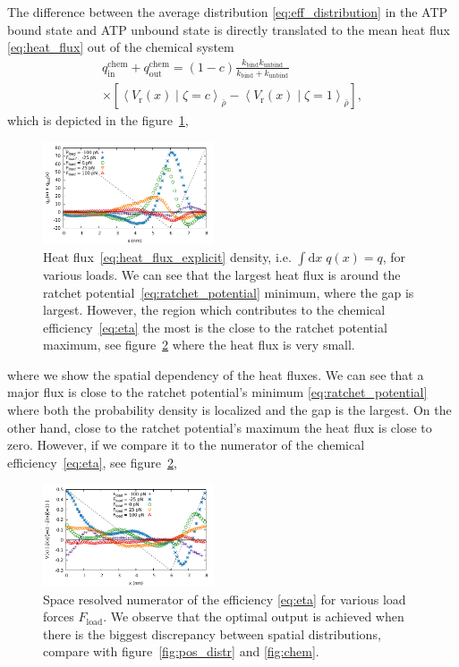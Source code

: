 \documentclass[aps,pre,twocolumn,showpacs,showkeys,superscriptaddress,floatfix]{revtex4-1}
\newcommand{\rmd}{{\mathrm d}}
\begin{document}
The difference between the average distribution \eqref{eq:eff_distribution} in the ATP bound state and ATP unbound state is directly translated to the mean heat flux \eqref{eq:heat_flux} out of the chemical system
\begin{multline}
q_\text{in}^\text{chem} + q_\text{out}^\text{chem} 
= (1-c) \frac{ k_\text{bind} k_\text{unbind} }{ k_\text{bind} + k_\text{unbind} } 
\\ \times
\left[ \left\langle V_\text{r}(x) \middle| \zeta = c \right\rangle_{\bar{\rho}} - \left\langle V_\text{r}(x) \middle| \zeta = 1 \right\rangle_{\bar{\rho}} \right] ,
\label{eq:heat_flux_explicit}
\end{multline} 
which is depicted in the figure~\ref{fig:chem_energy_distr}, 
\begin{figure}[t]
\centering
\includegraphics[width=0.45\textwidth,height=!]{chem_energy_distr_all_F}
\caption{
\label{fig:chem_energy_distr}
Heat flux~\eqref{eq:heat_flux_explicit} density, i.e. $\int \rmd x \; q(x) = q$, for various loads.  
We can see that the largest heat flux is around the ratchet potential~\eqref{eq:ratchet_potential} minimum, where the gap is largest. 
However, the region which contributes to the chemical efficiency~\eqref{eq:eta} the most is the close to the ratchet potential maximum, 
see figure~\ref{fig:chem_efficiency_distr} where the heat flux is very small. 
}
\end{figure}
where we show the spatial dependency of the heat fluxes.
We can see that a major flux is close to the ratchet potential's minimum \eqref{eq:ratchet_potential} where both the probability density is localized and the gap is the largest. 
On the other hand, close to the ratchet potential's maximum the heat flux is close to zero.
However, if we compare it to the numerator of the chemical efficiency~\eqref{eq:eta}, see figure~\ref{fig:chem_efficiency_distr}, 
\begin{figure}[t]
\centering
\includegraphics[width=0.45\textwidth,height=!]{chem_efficiency_distr_all_F}
\caption{
\label{fig:chem_efficiency_distr}
Space resolved numerator of the efficiency \eqref{eq:eta} for various load forces $F_\text{load}$. 
We observe that the optimal output is achieved when there is the biggest discrepancy between spatial distributions, compare with figure~\ref{fig:pos_distr} and \ref{fig:chem}. 
}
\end{figure}
\end{document}
